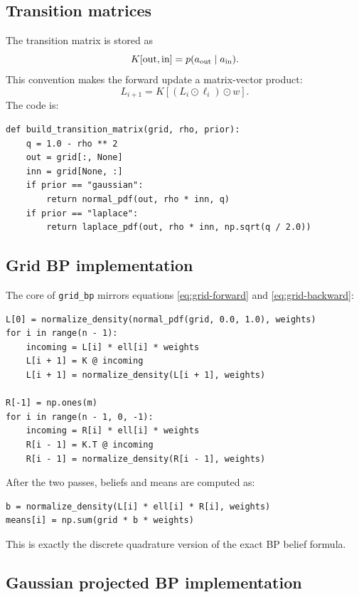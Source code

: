 \documentclass[11pt]{article}
\begin{document}
\subsection{Transition matrices}

The transition matrix is stored as
\begin{equation}
  K[\text{out},\text{in}]=p(a_{\rm out}\mid a_{\rm in}).
\end{equation}
This convention makes the forward update a matrix-vector product:
\begin{equation}
  L_{i+1}=K\left[(L_i\odot \ell_i)\odot w\right].
\end{equation}
The code is:
\begin{lstlisting}[style=pythonstyle]
def build_transition_matrix(grid, rho, prior):
    q = 1.0 - rho ** 2
    out = grid[:, None]
    inn = grid[None, :]
    if prior == "gaussian":
        return normal_pdf(out, rho * inn, q)
    if prior == "laplace":
        return laplace_pdf(out, rho * inn, np.sqrt(q / 2.0))
\end{lstlisting}

\subsection{Grid BP implementation}

The core of \texttt{grid\_bp} mirrors equations \eqref{eq:grid-forward} and \eqref{eq:grid-backward}:
\begin{lstlisting}[style=pythonstyle]
L[0] = normalize_density(normal_pdf(grid, 0.0, 1.0), weights)
for i in range(n - 1):
    incoming = L[i] * ell[i] * weights
    L[i + 1] = K @ incoming
    L[i + 1] = normalize_density(L[i + 1], weights)

R[-1] = np.ones(m)
for i in range(n - 1, 0, -1):
    incoming = R[i] * ell[i] * weights
    R[i - 1] = K.T @ incoming
    R[i - 1] = normalize_density(R[i - 1], weights)
\end{lstlisting}
After the two passes, beliefs and means are computed as:
\begin{lstlisting}[style=pythonstyle]
b = normalize_density(L[i] * ell[i] * R[i], weights)
means[i] = np.sum(grid * b * weights)
\end{lstlisting}
This is exactly the discrete quadrature version of the exact BP belief formula.

\subsection{Gaussian projected BP implementation}
\end{document}
